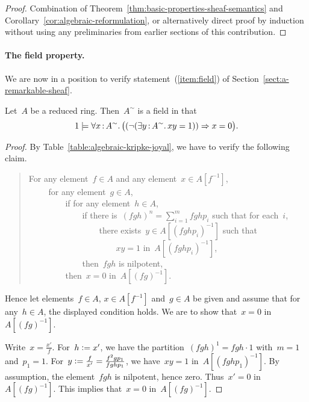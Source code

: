 \documentclass{ws-rv9x6}
\begin{document}
{\begin{proof}Combination of Theorem~\ref{thm:basic-properties-sheaf-semantics}
and Corollary~\ref{cor:algebraic-reformulation}, or alternatively direct proof
by induction without using any preliminaries from earlier sections of this
contribution.\end{proof}


\paragraph{The field property.} We are now in a position to verify
statement~(\ref{item:field}) of Section~\ref{sect:a-remarkable-sheaf}.

\begin{proposition}\label{prop:field-property}
Let~$A$ be a reduced ring. Then~$A^\sim$ is a field in that
\[ 1 \models \forall x\,{:}\,A^\sim\mathpunct{.} \bigl((\neg(\exists y\,{:}\,A^\sim\mathpunct{.} xy = 1)) \Rightarrow
x = 0\bigr). \]
\end{proposition}

\begin{proof}By Table~\ref{table:algebraic-kripke-joyal}, we have to verify the
following claim.
\begin{quote}
For any element~$f \in A$ and any element~$x \in A[f^{-1}]$, \\
${\qquad}$ for any element~$g \in A$, \\
${\qquad\qquad}$ if for any element~$h \in A$, \\
${\qquad\qquad\qquad}$ if there is~$(fgh)^n = \sum_{i=1}^m fghp_i$
such that for each~$i$, \\
${\qquad\qquad\qquad\qquad}$ there exists~$y \in
A[(fghp_i)^{-1}]$ such that \\
${\qquad\qquad\qquad\qquad\qquad}$ $xy = 1$ in~$A[(fghp_i)^{-1}]$, \\
${\qquad\qquad\qquad}$ then~$fgh$ is nilpotent, \\
${\qquad\qquad}$ then~$x = 0$ in~$A[(fg)^{-1}]$.
\end{quote}
Hence let elements~$f \in A$, $x \in A[f^{-1}]$ and~$g \in A$ be given and
assume that for any~$h \in A$, the displayed condition holds. We are to show
that~$x = 0$ in~$A[(fg)^{-1}]$.

Write~$x = \frac{x'}{f}$. For~$h \vcentcolon= x'$, we have the
partition~$(fgh)^1 = fgh \cdot 1$ with~$m = 1$ and~$p_1 = 1$. For~$y \vcentcolon=
\frac{f}{x'} = \frac{f^2gp_1}{fghp_1}$, we have~$xy = 1$ in~$A[(fghp_1)^{-1}]$.
By assumption, the element~$fgh$ is nilpotent, hence zero. Thus~$x' = 0$
in~$A[(fg)^{-1}]$. This implies that~$x = 0$ in~$A[(fg)^{-1}]$.
\end{proof}

}
\end{document}
